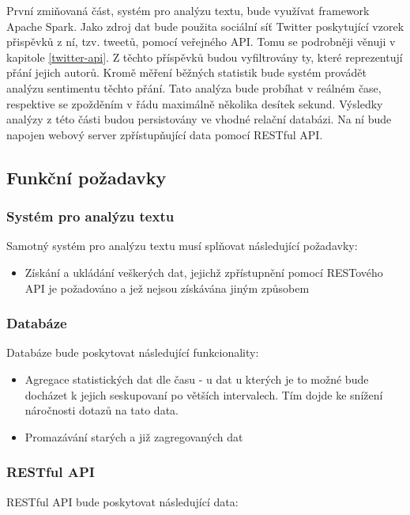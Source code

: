 \documentclass[thesis=B,czech]{FITthesis}[2012/06/26]
\begin{document}
	 První zmiňovaná část, systém pro analýzu textu, bude využívat framework Apache Spark. Jako zdroj dat bude použita sociální síť Twitter poskytující vzorek přispěvků z ní, tzv. tweetů, pomocí veřejného API. Tomu se podrobněji věnuji v kapitole \ref{twitter-api}. Z těchto příspěvků budou vyfiltrovány ty, které reprezentují přání jejich autorů. Kromě měření běžných statistik bude systém provádět analýzu sentimentu těchto přání. Tato analýza bude probíhat v reálném čase, respektive se zpožděním v řádu maximálně několika desítek sekund.  Výsledky analýzy z této části budou persistovány ve vhodné relační databázi. Na ní bude napojen webový server zpřístupňující data pomocí RESTful API. 

\subsection{Funkční požadavky}
\label{pozadavky}
\subsubsection{Systém pro analýzu textu}
Samotný systém pro analýzu textu musí splňovat následující požadavky:
\begin{itemize}
\item Získání a ukládání veškerých dat, jejichž zpřístupnění pomocí RESTového API je požadováno a jež nejsou získávána jiným způsobem
\end{itemize}
\subsubsection{Databáze}
 Databáze bude poskytovat následující funkcionality:
\begin{itemize}
\item Agregace statistických dat dle času - u dat u kterých je to možné bude docházet k jejich seskupovaní po větších intervalech. Tím dojde ke snížení náročnosti dotazů na tato data. 
\item Promazávání starých a již zagregovaných dat
\end{itemize}
\subsubsection{RESTful API}
RESTful API bude poskytovat následující data:
\end{document}
